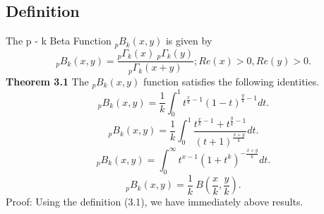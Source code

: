 \documentclass[11pt,a4paper]{article}
\numberwithin{equation}{section}
\begin{document}
\subsection{Definition}
The p - k Beta Function $ _{p}B_{k}(x,y) $ is given by 
\begin{equation}
    _{p}B_{k}(x,y)=\frac{_{p}\Gamma _{k}(x)\: _{p}\Gamma _{k}(y)}{_{p}\Gamma _{k}(x+y)}; Re(x)>0, Re(y)>0.
\end{equation}  
\textbf{Theorem 3.1} The $ _{p}B_{k}(x,y) $ function satisfies the following identities. 
\begin{equation}
  _{p}B_{k}(x,y)=\frac{1}{k} \int_{0}^{1}t^{\frac{x}{k}-1}(1-t)^{\frac{y}{k}-1}dt.
 \end{equation} 
\begin{equation}
  _{p}B_{k}(x,y)=\frac{1}{k} \int_{0}^{1}\frac{t^{\frac{x}{k}-1}+t^{\frac{y}{k}-1}}{(t+1)^{\frac{x+y}{k}}}dt.
 \end{equation}
\begin{equation}
  _{p}B_{k}(x,y)= \int_{0}^{\infty}t^{x-1}(1+t^{k})^{-\frac{x+y}{k}}dt.
 \end{equation} 
\begin{equation}
  _{p}B_{k}(x,y)=\frac{1}{k}\: B(\frac{x}{k},\frac{y}{k}).
 \end{equation}
 Proof: Using the definition (3.1), we have immediately above results.
\end{document}
